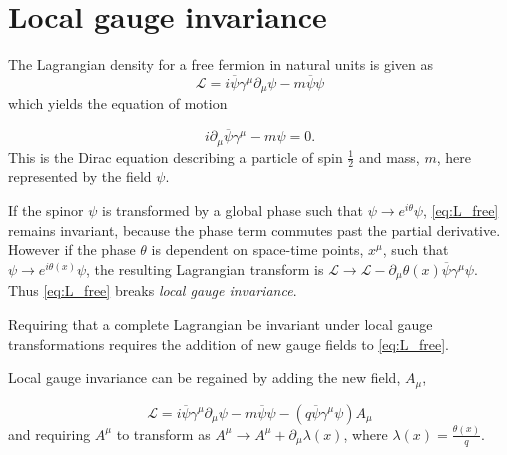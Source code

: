 \section{Local gauge invariance}
\label{sec:gauge}
The Lagrangian density for a free fermion in natural units is given as
\begin{equation}
  \label{eq:L_free}
  \mathcal{L} = i\overline{\psi}\gamma^{\mu}\partial_{\mu}\psi - m\overline{\psi}\psi
\end{equation}
which yields the equation of motion

\begin{equation}
 i\partial_{\mu}\overline{\psi}\gamma^{\mu} -  m\psi = 0.
\end{equation}
This is the Dirac equation describing a particle of spin $\frac{1}{2}$ and mass, $m$, here represented by the field $\psi$. 

If the spinor $\psi$ is transformed by a global phase such that $\psi \to e^{i\theta}\psi$, \autoref{eq:L_free} remains invariant, because the phase term commutes past the partial derivative. However if the phase $\theta$ is dependent on space-time points, $x^{\mu}$, such that $\psi \to e^{i\theta(x)}\psi$, the resulting Lagrangian transform is $\mathcal{L} \to \mathcal{L} - \partial_{\mu}\theta(x)\overline{\psi}\gamma^{\mu}\psi$. Thus \autoref{eq:L_free} breaks \emph{local gauge invariance}.

Requiring that a complete Lagrangian be invariant under local gauge transformations requires the addition of new gauge fields to \autoref{eq:L_free}.

Local gauge invariance can be regained by adding the new field, $A_{\mu}$,

\begin{equation}
  \mathcal{L} = i\overline{\psi}\gamma^{\mu}\partial_{\mu}\psi - m\overline{\psi}\psi - (q\overline{\psi}\gamma^{\mu}\psi)A_{\mu}
  \label{eq:L_bound}
\end{equation}
and requiring $A^{\mu}$ to transform as $A^{\mu} \to A^{\mu} + \partial_{\mu}\lambda(x)$, where $\lambda(x) = \frac{\theta(x)}{q}$. %

